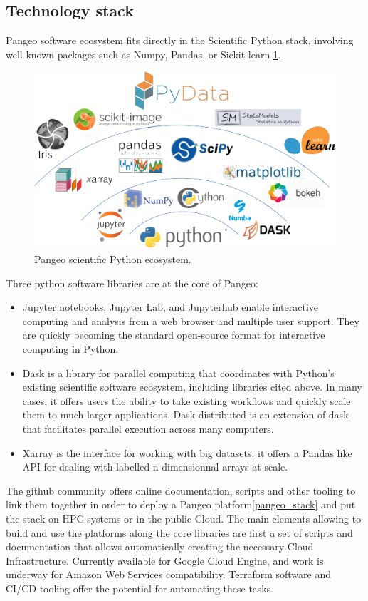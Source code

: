 \documentclass{article}
\begin{document}
\subsection{Technology stack}
\label{ssec:techstack}

Pangeo software ecosystem fits directly in the Scientific Python stack, involving well known packages such as Numpy, Pandas, or Sickit-learn \ref{scipy_stack}.

\begin{figure}
  \centering
  \includegraphics[width=\columnwidth]{pangeo_python_stack.png}
  \caption{\label{scipy_stack} Pangeo scientific Python ecosystem.}
\end{figure}

Three python software libraries are at the core of Pangeo:
\begin{itemize}
\item Jupyter notebooks, Jupyter Lab, and Jupyterhub enable interactive computing and analysis from a web browser and multiple user support. They are quickly becoming the standard open-source format for interactive computing in Python.
\item Dask is a library for parallel computing that coordinates with Python’s existing scientific software ecosystem, including libraries cited above. In many cases, it offers users the ability to take existing workflows and quickly scale them to much larger applications. Dask-distributed is an extension of dask that facilitates parallel execution across many computers.
\item Xarray is the interface for working with big datasets: it offers a Pandas like API for dealing with labelled n-dimensionnal arrays at scale.
\end{itemize}

The github community offers online documentation, scripts and other tooling to link them together in order to deploy a Pangeo platform\ref{pangeo_stack} and put the stack on HPC systems or in the public Cloud. The main elements allowing to build and use the platforms along the core libraries are first a set of scripts and documentation that allows automatically creating the necessary Cloud Infrastructure. Currently available for Google Cloud Engine, and work is underway for Amazon Web Services compatibility. Terraform software and CI/CD tooling offer the potential for automating these tasks.
\end{document}

